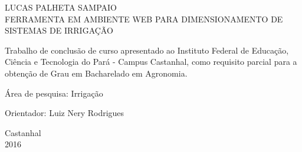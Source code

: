 \begin{titlepage}
\vfill
\begin{center}

    {\large LUCAS PALHETA SAMPAIO\\}
    \vspace{2cm}
    {\Large \textsc{FERRAMENTA EM AMBIENTE WEB PARA DIMENSIONAMENTO DE SISTEMAS DE IRRIGAÇÃO}\\}
    \vspace{1cm}
    \hspace{.45\linewidth}
    \begin{minipage}{.50\linewidth}

            Trabalho de conclusão de curso apresentado ao Instituto Federal de Educação, Ciência e Tecnologia do Pará - Campus Castanhal, como requisito parcial para a obtenção de Grau em Bacharelado em Agronomia.
            

            \vspace{0.5 cm}

            Área de pesquisa: Irrigação

            \vspace{0.5 cm}

            Orientador: Luiz Nery Rodrigues
    
    \end{minipage}

    \vspace{2cm}
    \vfill
    {\large Castanhal \\ 2016}
\end{center}

\end{titlepage}